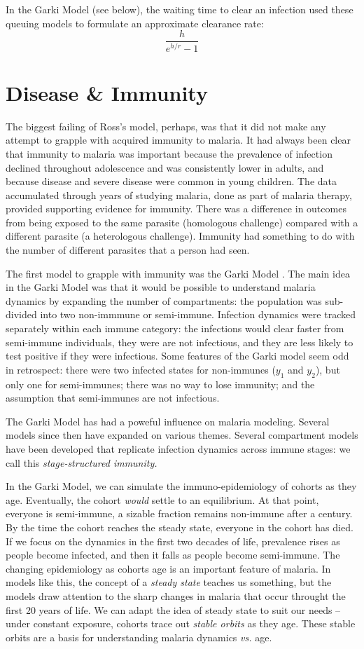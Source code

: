 \documentclass[
]{book}
\begin{document}
In the Garki Model (see below), the waiting time to clear an infection used these queuing models to formulate an approximate clearance rate: \[ \frac{h}{e^{h/r}-1}\]

\section{Disease \& Immunity}\label{disease-immunity}

The biggest failing of Ross's model, perhaps, was that it did not make any attempt to grapple with acquired immunity to malaria. It had always been clear that immunity to malaria was important because the prevalence of infection declined throughout adolescence and was consistently lower in adults, and because disease and severe disease were common in young children. The data accumulated through years of studying malaria, done as part of malaria therapy, provided supporting evidence for immunity. There was a difference in outcomes from being exposed to the same parasite (homologous challenge) compared with a different parasite (a heterologous challenge). Immunity had something to do with the number of different parasites that a person had seen.

The first model to grapple with immunity was the Garki Model \autocite{DietzK1974GarkiModel}. The main idea in the Garki Model was that it would be possible to understand malaria dynamics by expanding the number of compartments: the population was sub-divided into two non-immmune or semi-immune. Infection dynamics were tracked separately within each immune category: the infections would clear faster from semi-immune individuals, they were are not infectious, and they are less likely to test positive if they were infectious. Some features of the Garki model seem odd in retrospect: there were two infected states for non-immunes (\(y_1\) and \(y_2\)), but only one for semi-immunes; there was no way to lose immunity; and the assumption that semi-immunes are not infectious.

The Garki Model has had a poweful influence on malaria modeling. Several models since then have expanded on various themes. Several compartment models have been developed that replicate infection dynamics across immune stages: we call this \emph{stage-structured immunity.}

In the Garki Model, we can simulate the immuno-epidemiology of cohorts as they age. Eventually, the cohort \emph{would} settle to an equilibrium. At that point, everyone is semi-immune, a sizable fraction remains non-immune after a century. By the time the cohort reaches the steady state, everyone in the cohort has died. If we focus on the dynamics in the first two decades of life, prevalence rises as people become infected, and then it falls as people become semi-immune. The changing epidemiology as cohorts age is an important feature of malaria. In models like this, the concept of a \emph{steady state} teaches us something, but the models draw attention to the sharp changes in malaria that occur throught the first 20 years of life. We can adapt the idea of steady state to suit our needs -- under constant exposure, cohorts trace out \emph{stable orbits} as they age. These stable orbits are a basis for understanding malaria dynamics \emph{vs.} age.
\end{document}
